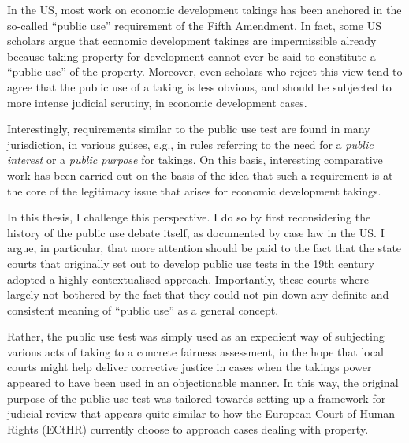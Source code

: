 
In the US, most work on economic development takings has been anchored in the so-called ``public use'' requirement of the Fifth Amendment. In fact, some US scholars argue that economic development takings are impermissible already because taking property for development cannot ever be said to constitute a ``public use'' of the property. Moreover, even scholars who reject this view tend to agree that the public use of a taking is less obvious, and should be subjected to more intense judicial scrutiny, in economic development cases.

Interestingly, requirements similar to the public use test are found in many jurisdiction, in various guises, e.g., in rules referring to the need for a {\it public interest} or a {\it public purpose} for takings. On this basis, interesting comparative work has been carried out on the basis of the idea that such a requirement is at the core of the legitimacy issue that arises for economic development takings.

In this thesis, I challenge this perspective. I do so by first reconsidering the history of the public use debate itself, as documented by case law in the US. I argue, in particular, that more attention should be paid to the fact that the state courts that originally set out to develop public use tests in the 19th century adopted a highly contextualised approach. Importantly, these courts where largely not bothered by the fact that they could not pin down any definite and consistent meaning of ``public use'' as a general concept. 

Rather, the public use test was simply used as an expedient way of subjecting various acts of taking to a concrete fairness assessment, in the hope that local courts might help deliver corrective justice in cases when the takings power appeared to have been used in an objectionable manner. In this way, the original purpose of the public use test was tailored towards setting up a framework for judicial review that appears quite similar to how the European Court of Human Rights (ECtHR) currently choose to approach cases dealing with property.

